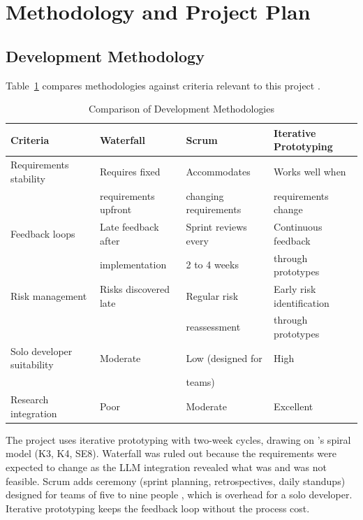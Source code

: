 \section{Methodology and Project Plan}
\label{sec:methodology}

\subsection{Development Methodology}

Table~\ref{tab:methodologies} compares methodologies against criteria relevant to this project \parencite{sommerville2016}.

\begin{table}[H]
\centering
\begin{tabular}{|l|l|l|l|}
\hline
\rowcolor{gray!20} \textbf{Criteria} & \textbf{Waterfall} & \textbf{Scrum} & \textbf{Iterative Prototyping} \\
\hline
Requirements stability & Requires fixed & Accommodates & Works well when \\
 & requirements upfront & changing requirements & requirements change \\
\hline
Feedback loops & Late feedback after & Sprint reviews every & Continuous feedback \\
 & implementation & 2 to 4 weeks & through prototypes \\
\hline
Risk management & Risks discovered late & Regular risk & Early risk identification \\
 & & reassessment & through prototypes \\
\hline
Solo developer suitability & Moderate & Low (designed for & High \\
 & & teams) & \\
\hline
Research integration & Poor & Moderate & Excellent \\
\hline
\end{tabular}
\caption{Comparison of Development Methodologies}
\label{tab:methodologies}
\end{table}

The project uses iterative prototyping with two-week cycles, drawing on \textcite{boehm1988}'s spiral model (K3, K4, SE8). Waterfall was ruled out because the requirements were expected to change as the LLM integration revealed what was and was not feasible. Scrum adds ceremony (sprint planning, retrospectives, daily standups) designed for teams of five to nine people \parencite{sommerville2016}, which is overhead for a solo developer. Iterative prototyping keeps the feedback loop without the process cost.

